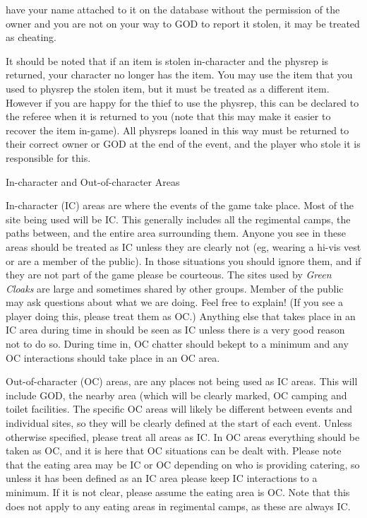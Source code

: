 \documentclass{scrbook}
\begin{document}
have your name attached to it on the database without the permission of the owner and you are not on your way to GOD to report it stolen, it may be treated as cheating.

It should be noted that if an item is stolen in-character and the physrep is returned, your character no longer has the item. You may use the item that you used to physrep the stolen item, but it must be treated as a different item. However if you are happy for the thief to use the physrep, this can be declared to the referee when it is returned to you (note that this may make it easier to recover the item in-game). All physreps loaned in this way must be returned to their correct owner or GOD at the end of the event, and the player who stole it is responsible for this.

In-character and Out-of-character Areas

In-character (IC) areas are where the events of the game take place. Most of the site being used will be IC. This generally includes all the regimental camps, the paths between, and the entire area surrounding them. Anyone you see in these areas should be treated as IC unless they are clearly not (eg, wearing a hi-vis vest or are a member of the public). In those situations you should ignore them, and if they are not part of the game please be courteous. The sites used by \textit{Green Cloaks} are large and sometimes shared by other groups. Member of the public may ask questions about what we are doing. Feel free to explain! (If you see a player doing this, please treat them as OC.) Anything else that takes place in an IC area during time in should be seen as IC unless there is a very good reason not to do so. During time in, OC chatter should bekept to a minimum and any OC interactions should take place in an OC area.

Out-of-character (OC) areas, are any places not being used as IC areas. This will include GOD, the nearby area (which will be clearly marked, OC camping and toilet facilities. The specific OC areas will likely be different between events and individual sites, so they will be clearly defined at the start of each event. Unless otherwise specified, please treat all areas as IC. In OC areas everything should be taken as OC, and it is here that OC situations can be dealt with. Please note that the eating area may be IC or OC depending on who is providing catering, so unless it has been defined as an IC area please keep IC interactions to a minimum. If it is not clear, please assume the eating area is OC. Note that this does not apply to any eating areas in regimental camps, as these are always IC.
\end{document}
